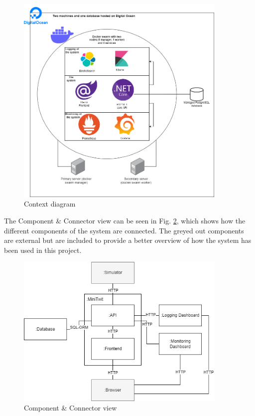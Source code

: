 \documentclass[10pt]{article}
\begin{document}
\begin{figure} [H]
  \centering
  \includegraphics[width=0.9\textwidth]{images/devops-diagram.png}
  \caption{Context diagram}
  \label{fig:context}
\end{figure}

The Component \& Connector view can be seen in Fig. \ref{fig:cc}, which shows how the different components of the system are connected. The greyed out components are external but are included to provide a better overview of how the system has been used in this project.

\begin{figure} [H]
  \centering
  \includegraphics[width=0.9\textwidth]{images/devops-cc.png}
  \caption{Component \& Connector view}
  \label{fig:cc}
\end{figure}
\end{document}
